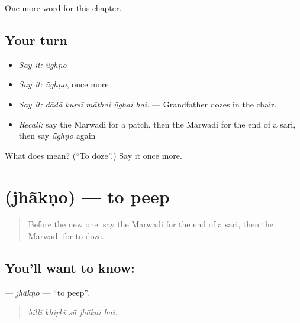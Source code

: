 \begin{grammarlens}[title={What you've built}]
One more word for this chapter.
\end{grammarlens}

\subsection*{Your turn}
\begin{itemize}
\raggedright
  \item \emph{Say it:} \emph{ū̃ghṇo}
  \item \emph{Say it:} \emph{ū̃ghṇo}, once more
  \item \emph{Say it:} \emph{dādā kursī māthai ū̃ghai hai.} — Grandfather dozes in the chair.
  \item \emph{Recall:} say the Marwadi for a patch, then the Marwadi for the end of a sari, then say \emph{ū̃ghṇo} again
\end{itemize}

\begin{tcolorbox}[breakable,colback=teal!4,colframe=teal!35!black,title={Before you move on}]
What does  mean? (\textquotedblleft{}To doze\textquotedblright{}.) Say it once more.
\end{tcolorbox}
\section[\texorpdfstring{\mw{झांकणो} (jhā̃kṇo)}{झांकणो (jhā̃kṇo)}]{ (jhā̃kṇo) — to peep}

\label{lesson:MW-C178-jhakno}



\begin{quote}
Before the new one: say the Marwadi for the end of a sari, then the Marwadi for to doze.
\end{quote}

\subsection*{You'll want to know: }
\textbf{} — \emph{jhā̃kṇo} — \textquotedblleft{}to peep\textquotedblright{}.

\begin{quote}
    
\end{quote}

\begin{quote}
\emph{billī khiṛkī sū̃ jhā̃kai hai.}
\end{quote}

